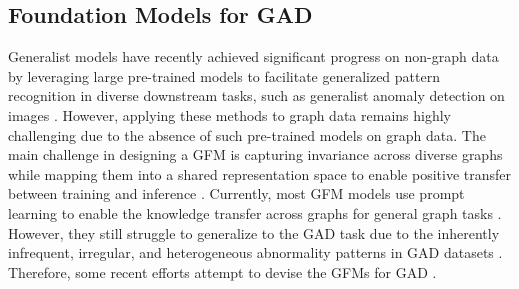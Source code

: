 


\subsection{Foundation Models for GAD}
Generalist models have recently achieved significant progress on non-graph data by leveraging large pre-trained models to facilitate generalized pattern recognition in diverse downstream tasks, such as generalist anomaly detection on images \cite{zhou2023anomalyclip,zhu2024toward}. However, applying these methods to graph data remains highly challenging due to the absence of such pre-trained models \cite{sun2023all, liu2023graphprompt, wen2023voucher} on graph data.
The main challenge in designing a GFM is capturing invariance across diverse graphs while mapping them into a shared representation space to enable positive transfer between training and inference \cite{maoposition,beaini2023towards,galkin2023towards}. Currently, most GFM models use prompt learning to enable the knowledge transfer across graphs for general graph tasks \cite{liu2023graphprompt, fang2024universal}.
However,
they still struggle to generalize to the GAD task due to the inherently infrequent, irregular, and heterogeneous
abnormality patterns in GAD datasets \cite{liu2024arc, niu2024zero, qiao2024deep}. Therefore, 
some recent efforts attempt to devise the GFMs for GAD \cite{niu2024zero, liu2024arc}.
